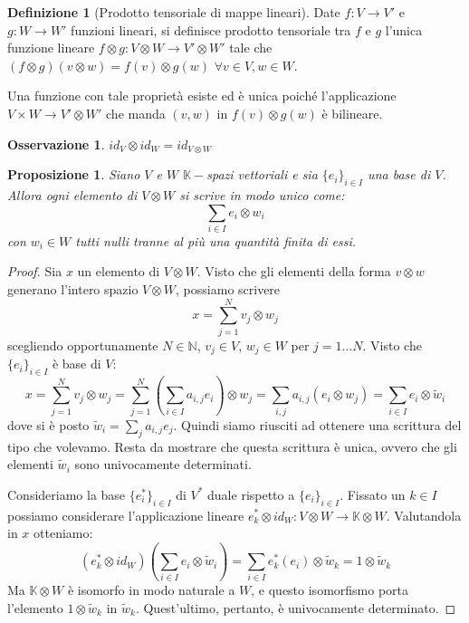 \documentclass[11pt]{article}
\theoremstyle{plain}
\newtheorem{prop}[thm]{Proposizione}
\theoremstyle{definition}
\newtheorem{defn}{Definizione}[section]
\newtheorem*{rem}{Osservazione}
\theoremstyle{remark}
\newcommand{\K}{\mathbb{K}}
\newcommand{\N}{\mathbb{N}}
\begin{document}
\begin{defn}[Prodotto tensoriale di mappe lineari]
Date $f:V \to V'$ e $g:W \to W'$ funzioni lineari, si definisce prodotto tensoriale tra $f$ e $g$ l'unica funzione lineare $f \otimes g : V \otimes W \to V' \otimes W'$ tale che $(f \otimes g)(v \otimes w)=f(v) \otimes g(w)$ $\forall v\in V, w\in W$.

Una funzione con tale proprietà esiste ed è unica poiché l'applicazione $V\times W \to V'\otimes W'$ che manda $(v,w)$ in $f(v)\otimes g(w)$ è bilineare.
\end{defn}

\begin{rem}
$id_V \otimes id_W = id_{V\otimes W}$
\end{rem}


\begin{prop}
Siano $V$ e $W$ $\K-$spazi vettoriali e sia $\{e_i\}_{i\in I}$ una base di $V$. Allora ogni elemento di $V\otimes W$ si scrive in modo unico come:
\[ \sum_{i\in I} e_i \otimes w_i\]
con $w_i\in W$ tutti nulli tranne al più una quantità finita di essi.
\end{prop}
\begin{proof}
Sia $x$ un elemento di $V\otimes W$.
Visto che gli elementi della forma $v\otimes w$ generano l'intero spazio $V\otimes W$, possiamo scrivere
\[ x = \sum_{j=1}^N v_j\otimes w_j \]
scegliendo opportunamente $N\in \N$, $v_j\in V$, $w_j\in W$ per $j=1\dots N$. Visto che $\{e_i\}_{i\in I}$ è base di $V$:
\[ x = \sum_{j=1}^N v_j\otimes w_j  = \sum_{j=1}^N \left(\sum_{i\in I} a_{i,j}e_i\right)\otimes w_j = \sum_{i,j} a_{i,j}(e_i\otimes w_j) = \sum_{i\in I} e_i\otimes\tilde w_i\]
dove si è posto $\tilde w_i = \sum_j a_{i,j}e_j$.
Quindi siamo riusciti ad ottenere una scrittura del tipo che volevamo. Resta da mostrare che questa scrittura è unica,
ovvero che gli elementi $\tilde w_i$ sono univocamente determinati.

Consideriamo la base $\{e_i^*\}_{i\in I}$ di $V^*$ duale rispetto a $\{e_i\}_{i\in I}$. Fissato un $k\in I$ possiamo considerare l'applicazione
lineare $e_k^*\otimes id_W: V\otimes W \to \K\otimes W$. Valutandola in $x$ otteniamo:
\[ (e_k^*\otimes id_W) \left(\sum_{i\in I} e_i\otimes\tilde w_i \right) = \sum_{i\in I} e_k^*(e_i)\otimes\tilde w_k = 1\otimes \tilde w_k\]
Ma $\K\otimes W$ è isomorfo in modo naturale a $W$, e questo isomorfismo porta l'elemento $1\otimes \tilde w_k$ in $\tilde w_k$.
Quest'ultimo, pertanto, è univocamente determinato.
\end{proof}
\end{document}

